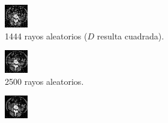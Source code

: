 \documentclass[a4paper]{article}
\begin{document}
\begin{figure}
\centering
\begin{subfigure}{0.4\linewidth}
  \centering
  \includegraphics[width=0.6\linewidth]{rayos/tomo3-aleat1444}
  \caption{1444 rayos aleatorios ($D$ resulta cuadrada).}
\end{subfigure}%
\begin{subfigure}{0.4\linewidth}
  \centering
  \includegraphics[width=0.6\linewidth]{rayos/tomo3-aleat2500}
  \caption{2500 rayos aleatorios.}
\end{subfigure}
\begin{subfigure}{0.4\linewidth}
  \centering
  \includegraphics[width=0.6\linewidth]{rayos/tomo3-aleat4000}

\end{subfigure}
\end{figure}
\end{document}
